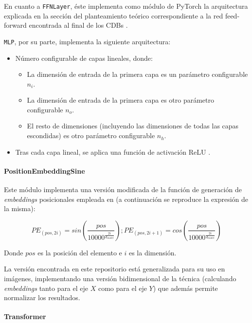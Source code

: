 \documentclass[a4paper]{article}
\begin{document}
En cuanto a \texttt{FFNLayer}, éste implementa como módulo de PyTorch la arquitectura explicada en la sección del planteamiento teórico correspondiente a la red feed-forward encontrada al final de los CDBs \cite{DDColor}.

\texttt{MLP}, por su parte, implementa la siguiente arquitectura:

\begin{itemize}
  \item{Número configurable de capas lineales, donde:
    \begin{itemize}
      \item{La dimensión de entrada de la primera capa es un parámetro configurable $n_i$.}
      \item{La dimensión de entrada de la primera capa es otro parámetro configurable $n_o$.}
      \item{El resto de dimensiones (incluyendo las dimensiones de todas las capas escondidas) es otro parámetro configurable $n_h$.}
    \end{itemize}
  }
  \item{Tras cada capa lineal, se aplica una función de activación ReLU \cite{ReLU}.}
\end{itemize}

\paragraph{PositionEmbeddingSine}

Este módulo implementa una versión modificada de la función de generación de \textit{embeddings} posicionales empleada en \cite{Attention} (a continuación se reproduce la expresión de la misma):

\begin{equation}
  PE_(pos, 2i) = sin(\frac{pos}{10000^\frac{2i}{d_{model}}});
  PE_(pos, 2i+1) = cos(\frac{pos}{10000^\frac{2i}{d_{model}}})
\end{equation}

Donde $pos$ es la posición del elemento e $i$ es la dimensión.

La versión encontrada en este repositorio está generalizada para su uso en imágenes, implementando una versión bidimensional de la técnica (calculando \textit{embeddings} tanto para el eje $X$ como para el eje $Y$) que además permite normalizar los resultados.

\paragraph{Transformer}
\end{document}
